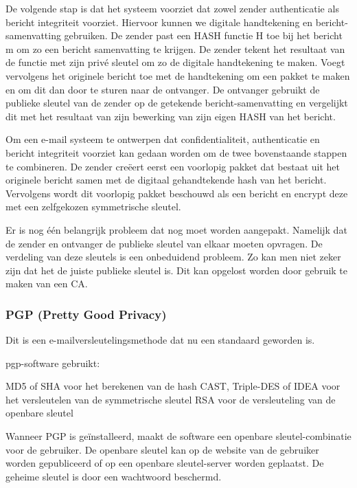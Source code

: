 \noindent De volgende stap is dat het systeem voorziet dat zowel zender authenticatie als bericht integriteit voorziet. Hiervoor kunnen we digitale handtekening en bericht-samenvatting gebruiken. De zender past een HASH functie H toe bij het bericht m om zo een bericht samenvatting te krijgen. De zender tekent het resultaat van de functie met zijn privé sleutel om zo de digitale handtekening te maken. Voegt vervolgens het originele bericht toe met de handtekening om een pakket te maken en om dit dan door te sturen naar de ontvanger. De ontvanger gebruikt de publieke sleutel van de zender op de getekende bericht-samenvatting en vergelijkt dit met het resultaat van zijn bewerking van zijn eigen HASH van het bericht.

\noindent Om een e-mail systeem te ontwerpen dat confidentialiteit, authenticatie en bericht integriteit voorziet kan gedaan worden om de twee bovenstaande stappen te combineren. De zender creëert eerst een voorlopig pakket dat bestaat uit het originele bericht samen met de digitaal gehandtekende hash van het bericht. Vervolgens wordt dit voorlopig pakket beschouwd als een bericht en encrypt deze met een zelfgekozen symmetrische sleutel.

\noindent Er is nog één belangrijk probleem dat nog moet worden aangepakt. Namelijk dat de zender en ontvanger de publieke sleutel van elkaar moeten opvragen. De verdeling van deze sleutels is een onbeduidend probleem. Zo kan men niet zeker zijn dat het de juiste publieke sleutel is. Dit kan opgelost worden door gebruik te maken van een CA.

\newpage

\subsubsection{PGP (Pretty Good Privacy)}

\fra  Dit is een e-mailversleutelingsmethode dat nu een standaard geworden is.

\noindent \acrshort{pgp}-software gebruikt:

\bi
\itf MD5 of SHA voor het berekenen van de hash
\itf CAST, Triple-DES of IDEA voor het versleutelen van de symmetrische sleutel
\itf RSA voor de versleuteling van de openbare sleutel
\ei
	
\noindent Wanneer PGP is geïnstalleerd, maakt de software een openbare sleutel-combinatie voor de gebruiker. De openbare sleutel kan op de website van de gebruiker worden gepubliceerd of op een openbare sleutel-server worden geplaatst. De geheime sleutel is door een wachtwoord beschermd.

